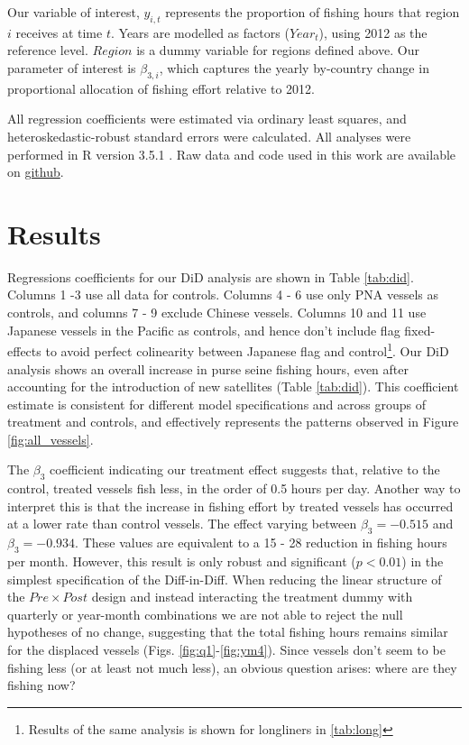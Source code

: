 \documentclass[11pt,]{article}
\let\rmarkdownfootnote\footnote%
\def\footnote{\protect\rmarkdownfootnote}
\begin{document}
Our variable of interest, \(y_{i,t}\) represents the proportion of
fishing hours that region \(i\) receives at time \(t\). Years are
modelled as factors (\(Year_t\)), using 2012 as the reference level.
\(Region\) is a dummy variable for regions defined above. Our parameter
of interest is \(\beta_{3,i}\), which captures the yearly by-country
change in proportional allocation of fishing effort relative to 2012.

All regression coefficients were estimated via ordinary least squares,
and heteroskedastic-robust standard errors were calculated. All analyses
were performed in R version 3.5.1 \citep{rcore_2018}. Raw data and code
used in this work are available on
\href{https://github.com/jcvdav/MPA_displacement}{github}.

\clearpage

\hypertarget{results}{%
\section{Results}\label{results}}

Regressions coefficients for our DiD analysis are shown in Table
\ref{tab:did}. Columns 1 -3 use all data for controls. Columns 4 - 6 use
only PNA vessels as controls, and columns 7 - 9 exclude Chinese vessels.
Columns 10 and 11 use Japanese vessels in the Pacific as controls, and
hence don't include flag fixed-effects to avoid perfect colinearity
between Japanese flag and
control\footnote{Results of the same analysis is shown for longliners in \ref{tab:long}}.
Our DiD analysis shows an overall increase in purse seine fishing hours,
even after accounting for the introduction of new satellites (Table
\ref{tab:did}). This coefficient estimate is consistent for different
model specifications and across groups of treatment and controls, and
effectively represents the patterns observed in Figure
\ref{fig:all_vessels}.

The \(\beta_3\) coefficient indicating our treatment effect suggests
that, relative to the control, treated vessels fish less, in the order
of 0.5 hours per day. Another way to interpret this is that the increase
in fishing effort by treated vessels has occurred at a lower rate than
control vessels. The effect varying between \(\beta_3 = -0.515\) and
\(\beta_3 = -0.934\). These values are equivalent to a 15 - 28 reduction
in fishing hours per month. However, this result is only robust and
significant (\(p < 0.01\)) in the simplest specification of the
Diff-in-Diff. When reducing the linear structure of the
\(Pre \times Post\) design and instead interacting the treatment dummy
with quarterly or year-month combinations we are not able to reject the
null hypotheses of no change, suggesting that the total fishing hours
remains similar for the displaced vessels (Figs.
\ref{fig:q1}-\ref{fig:ym4}). Since vessels don't seem to be fishing less
(or at least not much less), an obvious question arises: where are they
fishing now?
\end{document}
